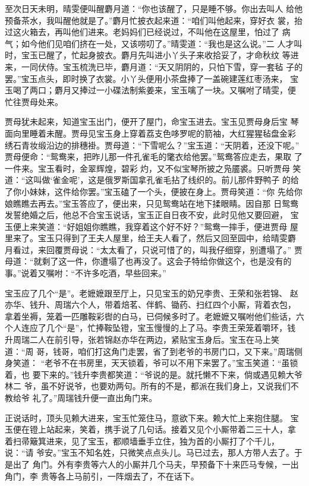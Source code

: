 至次日天未明，晴雯便叫醒麝月道：“你也该醒了，只是睡不够。你出去叫人
给他预备茶水，我叫醒他就是了。”麝月忙披衣起来道：“咱们叫他起来，穿好衣
裳，抬过这火箱去，再叫他们进来。老妈妈们已经说过，不叫他在这屋里，怕过了
病气；如今他们见咱们挤在一处，又该唠叨了。”晴雯道：“我也是这么说。”二
人才叫时，宝玉已醒了，忙起身披衣。麝月先叫进小丫头子来收拾妥了，才命秋纹
等进来，一同伏侍。宝玉梳洗已毕，麝月道：“天又阴阴的，只怕下雪，穿一套毡
子的罢。”宝玉点头，即时换了衣裳。小丫头便用小茶盘捧了一盖碗建莲红枣汤来，
宝玉喝了两口；麝月又捧过一小碟法制紫姜来，宝玉噙了一块。又嘱咐了晴雯，便
忙往贾母处来。

贾母犹未起来，知道宝玉出门，便开了屋门，命宝玉进去。宝玉见贾母身后宝
琴面向里睡着未醒。贾母见宝玉身上穿着荔支色哆罗呢的箭袖，大红猩猩毡盘金彩
绣石青妆缎沿边的排穗褂。贾母道：“下雪呢么？”宝玉道：“天阴着，还没下呢。”
贾母便命：“鸳鸯来，把昨儿那一件孔雀毛的氅衣给他罢。”鸳鸯答应走去，果取
了一件来。宝玉看时，金翠辉煌，碧彩灼，又不似宝琴所披之凫靥裘。只听贾母
笑道：“这叫做‘雀金呢’，这是俄罗斯国拿孔雀毛拈了线织的。前儿那件野鸭子
的给了你小妹妹，这件给你罢。”宝玉磕了一个头，便披在身上。贾母笑道：“你
先给你娘瞧瞧去再去。”宝玉答应了，便出来，只见鸳鸯站在地下揉眼睛。因自那
日鸳鸯发誓绝婚之后，他总不合宝玉说话，宝玉正自日夜不安，此时见他又要回避，
宝玉便上来笑道：“好姐姐你瞧瞧，我穿着这个好不好？”鸳鸯一摔手，便进贾母
屋里来了。宝玉只得到了王夫人屋里，给王夫人看了，然后又回至园中，给晴雯麝
月看过，来回覆贾母说：“太太看了，只说可惜了的，叫我仔细穿，别遭塌了。”
贾母道：“就剩了这一件，你遭塌了也再没了。这会子特给你做这个，也是没有的
事。”说着又嘱咐：“不许多吃酒，早些回来。”

宝玉应了几个“是”。老嬷嬷跟至厅上，只见宝玉的奶兄李贵、王荣和张若锦、
赵亦华、钱升、周瑞六个人，带着焙茗、伴鹤、锄药、扫红四个小厮，背着衣包，
拿着坐褥，笼着一匹雕鞍彩辔的白马，已伺候多时了。老嬷嬷又嘱咐他们些话，六
个人连应了几个“是”，忙捧鞍坠镫，宝玉慢慢的上了马。李贵王荣笼着嚼环，钱
升周瑞二人在前引导，张若锦赵亦华在两边，紧贴宝玉身后。宝玉在马上笑道：“周
哥，钱哥，咱们打这角门走罢，省了到老爷的书房门口，又下来。”周瑞侧身笑道：
“老爷不在书房里，天天锁着，爷可以不用下来罢了。”宝玉笑道：“虽锁着，也
要下来的。”钱升李贵都笑道：“爷说的是。就托懒不下来，倘或遇见赖大爷林二
爷，虽不好说爷，也要劝两句。所有的不是，都派在我们身上，又说我们不教给爷
礼了。”周瑞钱升便一直出角门来。

正说话时，顶头见赖大进来，宝玉忙笼住马，意欲下来。赖大忙上来抱住腿。
宝玉便在镫上站起来，笑着，携手说了几句话。接着又见个小厮带着二三十人，拿
着扫帚簸箕进来，见了宝玉，都顺墙垂手立住，独为首的小厮打了个千儿，说：“请
爷安。”宝玉不知名姓，只微笑点点头儿。马已过去，那人方带人去了。于是出了
角门。外有李贵等六人的小厮并几个马夫，早预备下十来匹马专候，一出角门，李
贵等各上马前引，一阵烟去了，不在话下。

